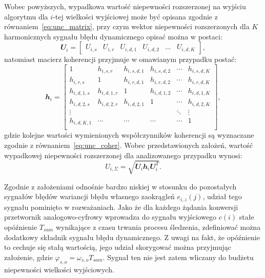Wobec powyższych, wypadkowa wartość niepewności rozszerzonej na wyjściu algorytmu dla $i$-tej wielkości wyjściowej może być opisana zgodnie z równaniem~\eqref{eq:unc_matrix}, przy czym wektor niepewności rozszerzonych dla $K$ harmonicznych sygnału błędu dynamicznego opisać można w postaci:
\begin{equation}
\mathbfit{U}_{i} =
\begin{bmatrix}
U_{i,s} & U_{i,r} & U_{i,d,1} & U_{i,d,2} & \hdots & U_{i,d,K}
\end{bmatrix}
\label{eq:pom_uncout_uncvect},
\end{equation}
natomiast macierz koherencji przyjmuje w omawianym przypadku postać:
\begin{equation}
\mathbfit{h}_{i} =
\begin{bmatrix}
1           & h_{i,s,r}   & h_{i,s,d,1} & h_{i,s,d,2} & \cdots & h_{i,s,d,K} \\
h_{i,r,s}   & 1           & h_{i,r,d,1} & h_{i,r,d,2} & \cdots & h_{i,r,d,K} \\
h_{i,d,1,s} & h_{i,d,1,r} & 1           & h_{i,d,1,2} & \cdots & h_{i,d,1,K} \\
h_{i,d,2,s} & h_{i,d,2,r} & h_{i,d,2,1} & 1           & \cdots & h_{i,d,2,K} \\
\vdots      &             &             &             & \ddots & \vdots      \\
h_{i,d,K,1} & \cdots      & \cdots      & \cdots      & \cdots & 1           \\
\end{bmatrix}
\label{eq:pom_uncout_cohers},
\end{equation}
gdzie kolejne wartości wymienionych współczynników koherencji są wyznaczane zgodnie z równaniem~\eqref{eq:unc_coher}. Wobec przedstawionych założeń, wartość wypadkowej niepewności rozszerzonej dla analizowanego przypadku wynosi:
\begin{equation}
U_{i,\Sigma} = \sqrt{\mathbfit{U}_{i} \mathbfit{h}_{i} \mathbfit{U}_{i}^{T}} \label{eq:pom_uncout_sum}.
\end{equation}

Zgodnie z założeniami odnośnie bardzo niskiej w stosunku do pozostałych sygnałów błędów wariancji błędu własnego zaokrągleń $e_{i,z}(j)$, udział tego sygnału pominięto w rozważaniach. Jako że dla każdego żądania konwersji przetwornik analogowo-cyfrowy wprowadza do sygnału wyjściowego $c(i)$ stałe opóźnienie $T_{sam}$ wynikające z czasu trwania procesu śledzenia, zdefiniować można dodatkowy składnik sygnału błędu dynamicznego. Z uwagi na fakt, że opóźnienie to cechuje się stałą wartością, jego udział skorygować można przyjmując założenie, gdzie $\varphi_{s,o} = \omega_{s,o} T_{sam}$. Sygnał ten nie jest zatem wliczany do budżetu niepewności wielkości wyjściowych.

